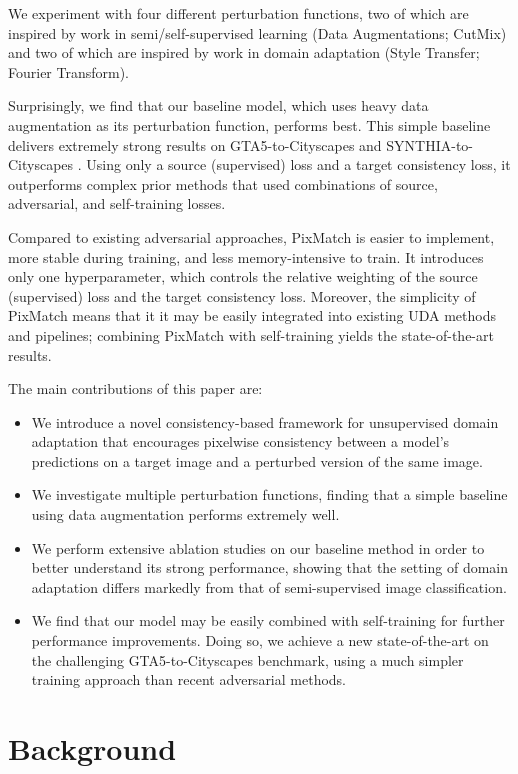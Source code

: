 \documentclass[final]{cvpr}
\begin{document}
We experiment with four different perturbation functions, two of which are inspired by work in semi/self-supervised learning (Data Augmentations; CutMix) and two of which are inspired by work in domain adaptation (Style Transfer; Fourier Transform). 

Surprisingly, we find that our baseline model, which uses heavy data augmentation as its perturbation function, performs best. This simple baseline delivers extremely strong results on GTA5-to-Cityscapes \cite{cityscapes} and SYNTHIA-to-Cityscapes \cite{synthia}. Using only a source (supervised) loss and a target consistency loss, it outperforms complex prior methods that used combinations of source, adversarial, and self-training losses. 

Compared to existing adversarial approaches, PixMatch is easier to implement, more stable during training, and less memory-intensive to train. It introduces only one hyperparameter, which controls the relative weighting of the source (supervised) loss and the target consistency loss. Moreover, the simplicity of PixMatch means that it it may be easily integrated into existing UDA methods and pipelines; combining PixMatch with self-training yields the state-of-the-art results. 

The main contributions of this paper are:

\begin{itemize}
\item We introduce a novel consistency-based framework for unsupervised domain adaptation that encourages pixelwise consistency between a model's predictions on a target image and a perturbed version of the same image. 
\item We investigate multiple perturbation functions, finding that a simple baseline using data augmentation performs extremely well. 
\item We perform extensive ablation studies on our baseline method in order to better understand its strong performance, showing that the setting of domain adaptation differs markedly from that of semi-supervised image classification. 
\item We find that our model may be easily combined with self-training for further performance improvements. Doing so, we achieve a new state-of-the-art on the challenging GTA5-to-Cityscapes benchmark, using a much simpler training approach than recent adversarial methods.
\end{itemize}

\section{Background}
\end{document}
